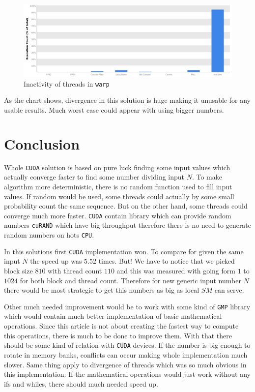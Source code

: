 \documentclass[a4paper]{article}
\begin{document}
\begin{figure}[H]
  \centering
    \includegraphics[width=1\textwidth]{inactive2.png}
  \caption{Inactivity of threads in \texttt{warp}}
  \label{inactive2}
\end{figure}

As the chart shows, divergence in this solution is huge making it unusable for any usable results. Much worst case could appear with using bigger numbers.

\section{Conclusion}

Whole \texttt{CUDA} solution is based on pure luck finding some input values which actually converge faster to find some number dividing input $N$. To make algorithm more deterministic, there is no random function used to fill input values. If random would be used, some threads could actually by some small probability count the same sequence. But on the other hand, some threads could converge much more faster. \texttt{CUDA} contain library which can provide random numbers \texttt{cuRAND} \cite{cuRAND} which have big throughput therefore there is no need to generate random numbers on hots \texttt{CPU}.

In this solutions first \texttt{CUDA} implementation won. To compare for given the same input $N$ the speed up was $5.52$ times. But! We have to notice that we picked block size $810$ with thread count $110$ and this was measured with going form $1$ to $1024$ for both block and thread count. Therefore for new generic input number $N$ there would be most strategic to get this numbers as big as local $SM$ can serve.

Other much needed improvement would be to work with some kind of \texttt{GMP} library which would contain much better implementation of basic mathematical operations. Since this article is not about creating the fastest way to compute this operations, there is much to be done to improve them. With that there should be some kind of relation with \texttt{CUDA} devices. If the number is big enough to rotate in memory banks, conflicts can occur making whole implementation much slower. Same thing apply to divergence of threads which was so much obvious in this implementation. If the mathematical operations would just work without any ifs and whiles, there should much needed speed up.




\end{document}
